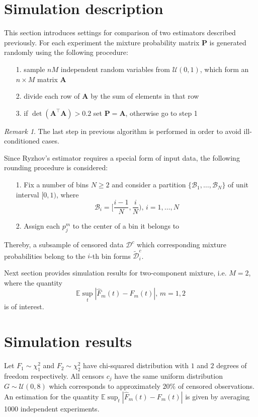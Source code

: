 \documentclass[12pt,reqno,a4paper,oneside]{article}
\theoremstyle{plain}
\theoremstyle{definition}
\theoremstyle{remark}
\newtheorem*{rem}{Remark}
\begin{document}
\section{Simulation description}
\label{sec:Simulation_description}
This section introduces settings for comparison of two estimators described previously. For each experiment the mixture probability matrix $\mathbf P$ is generated randomly using the following procedure:
\begin{itemize}
	\item[1.] sample $n M$ independent random variables from $\mathcal U(0, 1)$, which form an $n\times M$ matrix $\mathbf A$
	\item[2.] divide each row of $\mathbf A$ by the sum of elements in that row
	\item[3.] if $\det (\mathbf A ^\top \mathbf A) > 0.2$ set $\mathbf P = \mathbf A$, otherwise go to step 1
\end{itemize}
\begin{rem}
The last step in previous algorithm is performed in order to avoid ill-conditioned cases.
\end{rem}
Since Ryzhov's estimator requires a special form of input data, the following rounding procedure is considered: 
\begin{itemize}
	\item[1.] Fix a number of bins $N\geq 2$ and consider a partition $\{\mathcal B_1, \ldots, \mathcal B_N\}$ of unit interval $[0, 1)$, where $$ \mathcal B_i = [\frac {i - 1}{N}, \frac iN),\,i=1,\ldots, N$$
	\item[2.] Assign each $p_j^m$ to the center of a bin it belongs to
\end{itemize}
Thereby, a subsample of censored data $\mathcal D^c$ which corresponding mixture probabilities belong to the $i$-th bin forms $\tilde{\mathcal D}_i^c$.

Next section provides simulation results for two-component mixture, i.e. $M=2$, where the quantity
\begin{equation}
\mathbb E \sup _{t} |\hat F_m(t) - F_m(t)|, \, m=1,2
\end{equation}
is of interest.

\section{Simulation results}
\label{sec:Simulation_results}
Let $F_1\sim \chi ^2_1$ and $F_2\sim \chi ^2_2$ have chi-squared distribution with $1$ and $2$ degrees of freedom respectively. All censors $c_j$ have the same uniform distribution $G\sim \mathcal U(0, 8)$ which corresponds to approximately $20\%$ of censored observations. An estimation for the quantity $\mathbb E \sup _{t} |\hat F_m(t) - F_m(t)|$ is given by averaging 1000 independent experiments.
\end{document}
